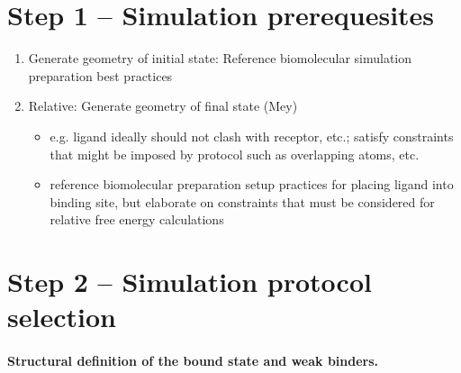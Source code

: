 \documentclass[9pt,bestpractices]{livecoms}
\begin{document}
\section{Step 1 -- Simulation prerequesites}
\label{sec:step1}
\begin{enumerate}
\item Generate geometry of initial state: Reference biomolecular simulation preparation best practices
\item Relative: Generate geometry of final state (Mey)
\begin{itemize}
\item e.g. ligand ideally should not clash with receptor, etc.; satisfy constraints that might be imposed by protocol such as overlapping atoms, etc.
\item reference biomolecular preparation setup practices for placing ligand into binding site, but elaborate on constraints that must be considered for relative free energy calculations
\end{itemize}
\end{enumerate}

\section{Step 2 -- Simulation protocol selection}
\label{sec:step2}

\paragraph{Structural definition of the bound state and weak binders.}
\end{document}
